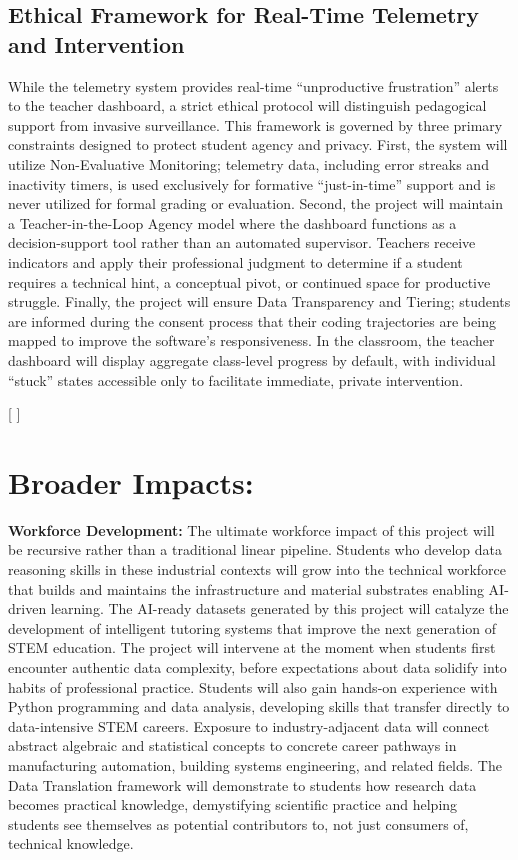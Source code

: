 \documentclass[11pt]{article}
\newcommand{\customsection}[1]{%
  \titleformat{name=\section,numberless}[runin]{\normalfont\bfseries}{}{0pt}{\newline}[ ]%
  \section{#1\newline}%
}
\begin{document}
\subsection{Ethical Framework for Real-Time Telemetry and Intervention}

While the telemetry system provides real-time ``unproductive frustration'' alerts to the teacher dashboard, a strict ethical protocol will distinguish pedagogical support from invasive surveillance.
This framework is governed by three primary constraints designed to protect student agency and privacy.
First, the system will utilize Non-Evaluative Monitoring; telemetry data, including error streaks and inactivity timers, is used exclusively for formative ``just-in-time'' support and is never utilized for formal grading or evaluation.
Second, the project will maintain a Teacher-in-the-Loop Agency model where the dashboard functions as a decision-support tool rather than an automated supervisor.
Teachers receive indicators and apply their professional judgment to determine if a student requires a technical hint, a conceptual pivot, or continued space for productive struggle.
Finally, the project will ensure Data Transparency and Tiering; students are informed during the consent process that their coding trajectories are being mapped to improve the software's responsiveness.
In the classroom, the teacher dashboard will display aggregate class-level progress by default, with individual ``stuck'' states accessible only to facilitate immediate, private intervention.

\customsection{Broader Impacts:}

\textbf{Workforce Development:}
The ultimate workforce impact of this project will be recursive rather than a traditional linear pipeline.
Students who develop data reasoning skills in these industrial contexts will grow into the technical workforce that builds and maintains the infrastructure and material substrates enabling AI-driven learning.
The AI-ready datasets generated by this project will catalyze the development of intelligent tutoring systems that improve the next generation of STEM education.
The project will intervene at the moment when students first encounter authentic data complexity, before expectations about data solidify into habits of professional practice.
Students will also gain hands-on experience with Python programming and data analysis, developing skills that transfer directly to data-intensive STEM careers.
Exposure to industry-adjacent data will connect abstract algebraic and statistical concepts to concrete career pathways in manufacturing automation, building systems engineering, and related fields.
The Data Translation framework will demonstrate to students how research data becomes practical knowledge, demystifying scientific practice and helping students see themselves as potential contributors to, not just consumers of, technical knowledge.
\end{document}
